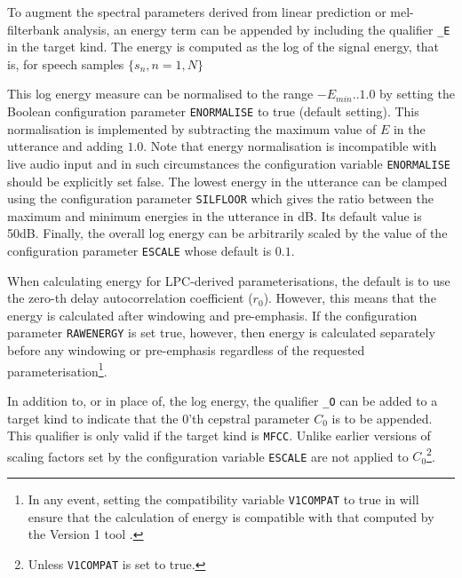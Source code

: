 
To augment the spectral parameters derived from linear prediction or
mel-filterbank analysis, an energy term can be appended by including the
qualifier \texttt{\_E} in the target kind.
The energy is computed as the log of the signal energy, that is, for speech
samples $\{s_n, n=1,N \}$

This log energy measure can be normalised to the range $-E_{min}..1.0$ by
setting the Boolean configuration parameter
\texttt{ENORMALISE} to true (default
setting).  This
normalisation is implemented by subtracting the maximum value of $E$ in the
utterance and adding $1.0$. 
Note that energy normalisation is incompatible with live audio 
input and in such circumstances the configuration variable \texttt{ENORMALISE} 
should be explicitly set false.
The lowest energy in the utterance can be clamped using the configuration
parameter
\texttt{SILFLOOR} which gives the ratio
between the maximum and minimum energies in the utterance in dB. Its default
value is 50dB. 
Finally, the overall log energy can be arbitrarily scaled by the value of the 
configuration parameter \texttt{ESCALE} whose 
default is $0.1$. 

When calculating energy for LPC-derived parameterisations, the default is to
use the zero-th delay autocorrelation coefficient ($r_0$).  However, this means
that the energy is calculated after windowing and pre-emphasis.  If the
configuration parameter \texttt{RAWENERGY}
is set true, however, then energy is calculated separately before any windowing
or pre-emphasis regardless of the requested parameterisation\footnote{ In any
event, setting the compatibility variable \texttt{V1COMPAT} to true in
 will ensure that the calculation of energy is compatible with
that computed by the Version 1 tool .  }.

In addition to, or in place of, the log energy, the qualifier
\texttt{\_O} can be added to a target kind
to indicate that the 0'th cepstral parameter $C_0$ is to be appended.  This
qualifier is only valid if the target kind is \texttt{MFCC}.  Unlike earlier
versions of \HTK\, scaling factors set by the configuration variable
\texttt{ESCALE} are not applied to $C_0$\footnote{ Unless \texttt{V1COMPAT} is
set to true.  }.

